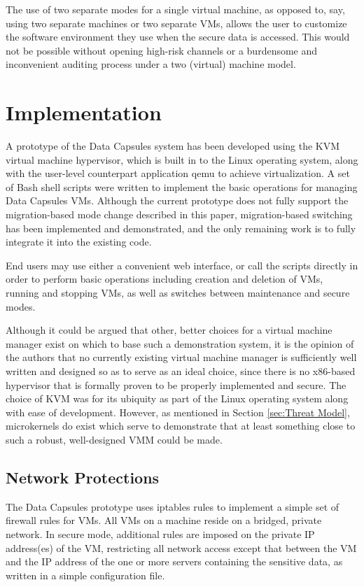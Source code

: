 \documentclass{acm_proc_article-sp}
\begin{document}
The use of two separate modes for a single virtual machine, as opposed to, say,
using two separate machines or two separate VMs, allows the user to customize
the software environment they use when the secure data is accessed.  This would
not be possible without opening high-risk channels or a burdensome and
inconvenient auditing process under a two (virtual) machine model.

\section{Implementation}
\label{sec:Implementation}

A prototype of the Data Capsules system has been developed using the KVM
virtual machine hypervisor, which is built in to the Linux operating system,
along with the user-level counterpart application qemu to achieve
virtualization.  A set of Bash shell scripts were written to implement the
basic operations for managing Data Capsules VMs.  Although the current
prototype does not fully support the migration-based mode change described in
this paper, migration-based switching has been implemented and demonstrated,
and the only remaining work is to fully integrate it into the existing code.

End users may use either a convenient web interface, or call the scripts
directly in order to perform basic operations including creation and deletion of
VMs, running and stopping VMs, as well as switches between maintenance and
secure modes.

Although it could be argued that other, better choices for a virtual machine
manager exist on which to base such a demonstration system, it is the opinion of
the authors that no currently existing virtual machine manager is sufficiently
well written and designed so as to serve as an ideal choice, since there is no
x86-based hypervisor that is formally proven to be properly implemented and
secure.  The choice of KVM was for its ubiquity as part of the Linux operating
system along with ease of development.  However, as mentioned in Section
\ref{sec:Threat Model}, microkernels do exist which serve to demonstrate that
at least something close to such a robust, well-designed VMM could be made.

\subsection{Network Protections}

The Data Capsules prototype uses iptables rules to implement a simple set of
firewall rules for VMs.  All VMs on a machine reside on a bridged, private
network.  In secure mode, additional rules are imposed on the private IP
address(es) of the VM, restricting all network access except that between the
VM and the IP address of the one or more servers containing the sensitive data,
as written in a simple configuration file.  
\end{document}
